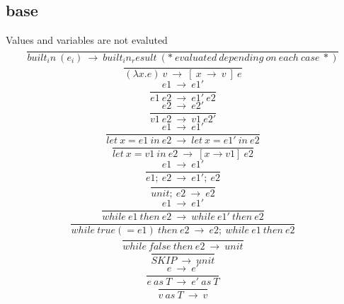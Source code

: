 \documentclass[10pt,a4paper]{article}
\begin{document}
\subsection*{ base }
Values and variables are not evaluted
\begin{equation}\frac{}{built_in\ (e_i)\ \rightarrow \ built_in_result                           \ (*\ evaluated\ depending\ on\ each\ case\ *)}\ \tag{\ E-BUILTIN\ }\end{equation}
\begin{equation}\frac{}{(\lambda x.e)\ v\ \rightarrow \ [\ x\ \rightarrow \ v\ ]\ e}\ \tag{\ E-LAMBDA\ }\end{equation}
\begin{equation}\frac{e1\ \rightarrow \ e1'}{e1\ e2\ \rightarrow \ e1'\ e2}\ \tag{\ E-APP1\ }\end{equation}
\begin{equation}\frac{e2\ \rightarrow \ e2'}{v1\ e2\ \rightarrow \ v1\ e2'}\ \tag{\ E-APP2\ }\end{equation}
\begin{equation}\frac{e1\ \rightarrow \ e1'}{let\ x=e1\ in\ e2\ \rightarrow \ let\ x=e1'\ in\ e2}\ \tag{\ E-LET\ }\end{equation}
\begin{equation}\frac{}{let\ x=v1\ in\ e2\ \rightarrow \ [x\rightarrow v1]\ e2}\ \tag{\ E-LETIN\ }\end{equation} 
\begin{equation}\frac{e1\ \rightarrow \ e1'}{e1;\ e2\ \rightarrow \ e1';\ e2}\ \tag{\ E-SEQ\ }\end{equation}
\begin{equation}\frac{}{unit;\ e2\ \rightarrow \ e2}\ \tag{\ E-SEQNEXT\ }\end{equation}
\begin{equation}\frac{e1\ \rightarrow \ e1'}{while\ e1\ then\ e2\ \rightarrow \ while\ e1'\ then\ e2}\ \tag{\ E-LOOP\ }\end{equation}
\begin{equation}\frac{}{while\ true(=e1)\ then\ e2\ \rightarrow \ e2;\ while\ e1\ then\ e2}\ \tag{\ E-LOOPTRUE\ }\end{equation}
\begin{equation}\frac{}{while\ false\ then\ e2\ \rightarrow \ unit}\ \tag{\ E-LOOPFALSE\ }\end{equation}
\begin{equation}\frac{}{SKIP\ \rightarrow \ unit}\ \tag{\ E-SKIP\ }\end{equation}
\begin{equation}\frac{e\ \rightarrow \ e'}{e\ as\ T\ \rightarrow \ e'\ as\ T}\ \tag{\ E-ASCR1\ }\end{equation}
\begin{equation}\frac{}{v\ as\ T \ \rightarrow \ v}\ \tag{\ E-ASCR2\ }\end{equation}  
\end{document}
